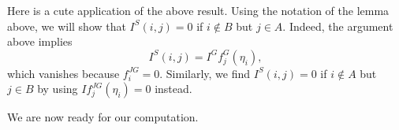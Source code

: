 \begin{remark} \label{rem:special-coefs-vanish}
	Here is a cute application of the above result.
    Using the notation of the lemma above, we will show that $I^S(i,j)=0$ if $i\notin B$ but $j\in A$. Indeed, the argument above implies
	\[I^S(i,j)=I^Gf_j^G(\eta_i),\]
	which vanishes because $f_i^{JG}=0$. Similarly, we find $I^S(i,j)=0$ if $i\notin A$ but $j\in B$ by using $If_j^{JG}(\eta_i)=0$ instead.
\end{remark}
We are now ready for our computation.
